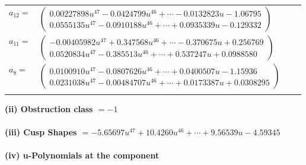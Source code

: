 \documentclass[1p]{elsarticle_modified}
\theoremstyle{definition}
\begin{document}
\begin{tabular}{m{7pt} m{180pt} m{7pt} m{180pt} }
\flushright $a_{12}=$&$\begin{pmatrix}0.00227898 u^{47}-0.0424799 u^{46}+\cdots-0.0132823 u-1.06795\\0.0555135 u^{47}-0.0910188 u^{46}+\cdots+0.0935339 u-0.129332\end{pmatrix}$ \\
\flushright $a_{11}=$&$\begin{pmatrix}-0.00405982 u^{47}+0.347568 u^{46}+\cdots-0.370675 u+0.256769\\0.0520834 u^{47}-0.385513 u^{46}+\cdots+0.537247 u+0.0988580\end{pmatrix}$ \\
\flushright $a_{8}=$&$\begin{pmatrix}0.0100910 u^{47}-0.0807626 u^{46}+\cdots+0.0400507 u-1.15936\\0.0231038 u^{47}-0.00484707 u^{46}+\cdots+0.0173387 u+0.0308295\end{pmatrix}$\\&\end{tabular}
\flushleft \textbf{(ii) Obstruction class $= -1$}\\~\\
\flushleft \textbf{(iii) Cusp Shapes $= -5.65697 u^{47}+10.4260 u^{46}+\cdots+9.56539 u-4.59345$}\\~\\
\newpage\renewcommand{\arraystretch}{1}
\flushleft \textbf{(iv) u-Polynomials at the component}\newline \\
\end{document}

